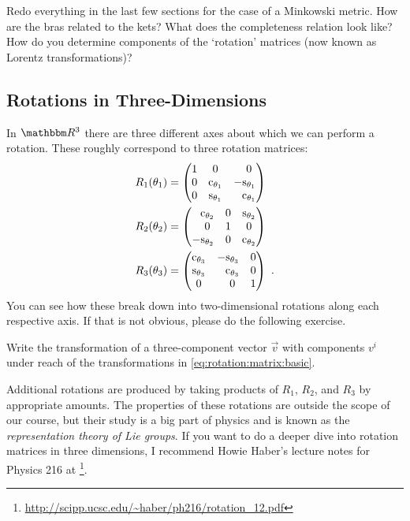 \documentclass[12pt, oneside]{report}    %
\let\oldsection\section
\def\section{%
  \setcounter{sidenote}{1}%
  \oldsection
}
\begin{document}
\begin{exercise}
 Redo everything in the last few sections for the case of a Minkowski metric. How are the bras related to the kets? What does the completeness relation look like? How do  you determine  components of the `rotation' matrices (now known as Lorentz transformations)?
\end{exercise}

\begin{subappendices}
\section{Rotations in Three-Dimensions}

In $\RR ^3$ there are three different axes about which we can perform a rotation. These roughly correspond to three rotation matrices:
\begin{align}
    R_1(\theta_1)
    &=
    \begin{pmatrix}
        1 & 0 & \pp 0 \\
        0 & \text{c}_{\theta_1} & -\text{s}_{\theta_1} \\
        0 & \text{s}_{\theta_1} & \pp \text{c}_{\theta_1}
    \end{pmatrix}
    \\
    R_2(\theta_2)
    &=
    \begin{pmatrix}
        \pp \text{c}_{\theta_2} & 0 & \text{s}_{\theta_2} \\
        \pp 0 & 1 & 0 \\
        -\text{s}_{\theta_2} & 0 & \text{c}_{\theta_2}
    \end{pmatrix}
    \\
    R_3(\theta_3)
    &=
    \begin{pmatrix}
        \text{c}_{\theta_3} & -\text{s}_{\theta_3} & 0 \\
        \text{s}_{\theta_3} & \pp\text{c}_{\theta_3} & 0 \\
        0 & \pp 0 & 1
    \end{pmatrix} \ .
    \label{eq:rotation:matrix:basic}
\end{align}
You can see how these break down into two-dimensional rotations along each respective axis. If that is not obvious, please do the following exercise.
\begin{exercise}
Write the transformation of a three-component vector $\vec{v}$ with components $v^i$ under reach of the transformations in \eqref{eq:rotation:matrix:basic}. 
\end{exercise}
Additional rotations are produced by taking products of $R_1$, $R_2$, and $R_3$ by appropriate amounts. The properties of these rotations are outside the scope of our course, but their study is a big part of physics and is known as the \emph{representation theory of Lie groups}. If you want to do a deeper dive into rotation matrices in three dimensions, I recommend Howie Haber's lecture notes for Physics 216 at \footnote{\url{http://scipp.ucsc.edu/~haber/ph216/rotation_12.pdf}}. 



\end{subappendices}
\end{document}
